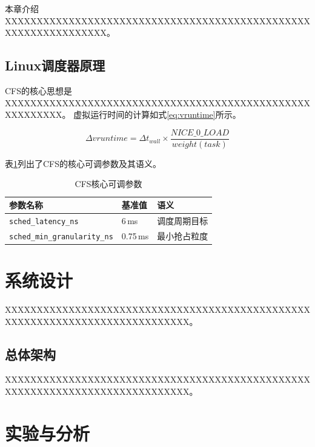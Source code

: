 \documentclass[a4paper, 12pt, twoside]{ctexart}
\begin{document}
本章介绍XXXXXXXXXXXXXXXXXXXXXXXXXXXXXXXXXXXXXXXXXXXXXXXXXXXXXXXXXXXXXXXX。

\subsection{Linux调度器原理}

CFS的核心思想是XXXXXXXXXXXXXXXXXXXXXXXXXXXXXXXXXXXXXXXXXXXXXXXXXXXXXXXXX。
虚拟运行时间的计算如式\eqref{eq:vruntime}所示。

\begin{equation}
    \Delta vruntime = \Delta t_{wall} \times \frac{NICE\_0\_LOAD}{weight(task)}
    \label{eq:vruntime}
\end{equation}

表\ref{tab:cfs-params}列出了CFS的核心可调参数及其语义。

\begin{table}[H]
    \centering
    \caption{CFS核心可调参数}
    \label{tab:cfs-params}
    \begin{tabular}{lll}
        \toprule
        \textbf{参数名称} & \textbf{基准值} & \textbf{语义} \\
        \midrule
        \texttt{sched\_latency\_ns} & 6\,ms & 调度周期目标 \\
        \texttt{sched\_min\_granularity\_ns} & 0.75\,ms & 最小抢占粒度 \\
        \bottomrule
    \end{tabular}
\end{table}

\section{系统设计}

XXXXXXXXXXXXXXXXXXXXXXXXXXXXXXXXXXXXXXXXXXXXXXXXXXXXXXXXXXXXXXXXXXXXXXXXXXXXX。

\subsection{总体架构}

XXXXXXXXXXXXXXXXXXXXXXXXXXXXXXXXXXXXXXXXXXXXXXXXXXXXXXXXXXXXXXXXXXXXXXXXXXXXX。

\section{实验与分析}
\end{document}
